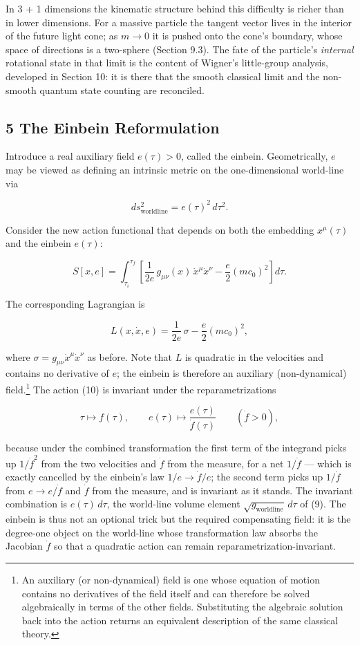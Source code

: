 \documentclass[
]{article}
\begin{document}
In 3 + 1 dimensions the kinematic structure behind this difficulty is
richer than in lower dimensions. For a massive particle the tangent
vector lives in the interior of the future light cone; as \(m \to 0\) it
is pushed onto the cone's boundary, whose space of directions is a
two-sphere (Section 9.3). The fate of the particle's \emph{internal}
rotational state in that limit is the content of Wigner's little-group
analysis, developed in Section 10: it is there that the smooth classical
limit and the non-smooth quantum state counting are reconciled.

\hypertarget{the-einbein-reformulation}{%
\subsection{5 The Einbein
Reformulation}\label{the-einbein-reformulation}}

Introduce a real auxiliary field \(e(\tau) > 0\), called the einbein.
Geometrically, \(e\) may be viewed as defining an intrinsic metric on
the one-dimensional world-line via

\[ds^{2}_{\mathrm{worldline}} = e(\tau)^{2}\, d\tau^{2}. \tag{9}\]

Consider the new action functional that depends on both the embedding
\(x^{\mu}(\tau)\) and the einbein \(e(\tau)\):

\[S[x, e] = \int_{\tau_{i}}^{\tau_{f}} \left[ \frac{1}{2e}\, g_{\mu\nu}(x)\, \dot{x}^{\mu} \dot{x}^{\nu} - \frac{e}{2}(mc_{0})^{2} \right] d\tau. \tag{10}\]

The corresponding Lagrangian is

\[L(x, \dot{x}, e) = \frac{1}{2e}\, \sigma - \frac{e}{2}(mc_{0})^{2}, \tag{11}\]

where \(\sigma = g_{\mu\nu} \dot{x}^{\mu} \dot{x}^{\nu}\) as before.
Note that \(L\) is quadratic in the velocities and contains no
derivative of \(e\); the einbein is therefore an auxiliary
(non-dynamical) field.\footnote{An auxiliary (or non-dynamical) field is
  one whose equation of motion contains no derivatives of the field
  itself and can therefore be solved algebraically in terms of the other
  fields. Substituting the algebraic solution back into the action
  returns an equivalent description of the same classical theory.} The
action (10) is invariant under the reparametrizations

\[\tau \longmapsto f(\tau), \qquad e(\tau) \longmapsto \frac{e(\tau)}{\dot{f}(\tau)} \qquad (\dot{f} > 0), \tag{12}\]

because under the combined transformation the first term of the
integrand picks up \(1/\dot{f}^{2}\) from the two velocities and
\(\dot{f}\) from the measure, for a net \(1/\dot{f}\) --- which is
exactly cancelled by the einbein's law \(1/e \to \dot{f}/e\); the second
term picks up \(1/\dot{f}\) from \(e \to e/\dot{f}\) and \(\dot{f}\)
from the measure, and is invariant as it stands. The invariant
combination is \(e(\tau)\, d\tau\), the world-line volume element
\(\sqrt{g_{\mathrm{worldline}}}\, d\tau\) of (9). The einbein is thus
not an optional trick but the required compensating field: it is the
degree-one object on the world-line whose transformation law absorbs the
Jacobian \(\dot{f}\) so that a quadratic action can remain
reparametrization-invariant.
\end{document}
